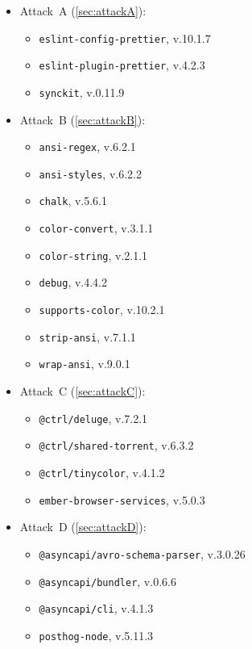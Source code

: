 \begin{itemize}
    \item Attack~A (\cref{sec:attackA}):
    \begin{itemize}
        \item \texttt{eslint-config-prettier}, v.10.1.7
        \item \texttt{eslint-plugin-prettier}, v.4.2.3
        \item \texttt{synckit}, v.0.11.9
    \end{itemize}
    \item Attack~B (\cref{sec:attackB}):
    \begin{itemize}
        \item \texttt{ansi-regex}, v.6.2.1
        \item \texttt{ansi-styles}, v.6.2.2
        \item \texttt{chalk}, v.5.6.1
        \item \texttt{color-convert}, v.3.1.1
        \item \texttt{color-string}, v.2.1.1
        \item \texttt{debug}, v.4.4.2
        \item \texttt{supports-color}, v.10.2.1
        \item \texttt{strip-ansi}, v.7.1.1
        \item \texttt{wrap-ansi}, v.9.0.1
    \end{itemize}
    \item Attack~C (\cref{sec:attackC}):
        \begin{itemize}
            \item \texttt{@ctrl/deluge}, v.7.2.1
            \item \texttt{@ctrl/shared-torrent}, v.6.3.2
            \item \texttt{@ctrl/tinycolor}, v.4.1.2
            \item \texttt{ember-browser-services}, v.5.0.3
        \end{itemize}
    \item Attack~D (\cref{sec:attackD}):
        \begin{itemize}
            \item \texttt{@asyncapi/avro-schema-parser}, v.3.0.26
            \item \texttt{@asyncapi/bundler}, v.0.6.6
            \item \texttt{@asyncapi/cli}, v.4.1.3
            \item \texttt{posthog-node}, v.5.11.3
        \end{itemize}
\end{itemize}

